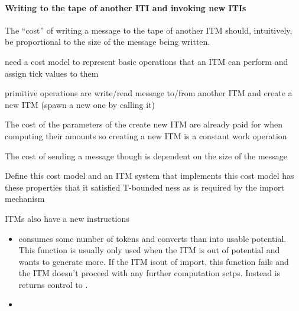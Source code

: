 \paragraph{Writing to the tape of another ITI and invoking new ITIs}
The ``cost'' of writing a message to the tape of another ITM should, intuitively, be proportional to the size of the message being written. 


need a cost model to represent basic operations that an ITM can perform and assign tick values to them

primitive operations are write/read message to/from another ITM and create a new ITM (spawn a new one by calling it)

The cost of the parameters of the create new ITM are already paid for when computing their amounts so creating a new ITM is a constant work operation

The cost of sending a message though is dependent on the size of the message

Define this cost model and an ITM system that implements this cost model has these properties that it satisfied T-bounded ness as is required by the import mechanism



ITMs also have a new instructions
\begin{itemize}
	\item {} consumes some number of tokens and converts than into usable potential. This function is usually only used when the ITM is out of potential and wants to generate more. If the ITM isout of import, this function fails and the ITM doesn't proceed with any further computation setps. Instead is returns control to .
	\item 
\end{itemize}

